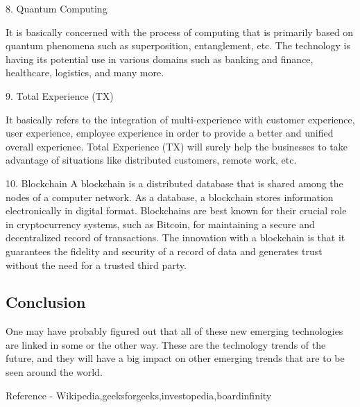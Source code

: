 \documentclass[11pt]{article}
\begin{document}
8. Quantum Computing

It is basically concerned with the process of computing that is primarily based on quantum phenomena such as superposition, entanglement, etc. The technology is having its potential use in various domains such as banking and finance, healthcare, logistics, and many more.

9. Total Experience (TX)

It basically refers to the integration of multi-experience with customer experience, user experience, employee experience in order to provide a better and unified overall experience. Total Experience (TX) will surely help the businesses to take advantage of situations like distributed customers, remote work, etc. 

10. Blockchain
A blockchain is a distributed database that is shared among the nodes of a computer network. As a database, a blockchain stores information electronically in digital format. Blockchains are best known for their crucial role in cryptocurrency systems, such as Bitcoin, for maintaining a secure and decentralized record of transactions. The innovation with a blockchain is that it guarantees the fidelity and security of a record of data and generates trust without the need for a trusted third party.
\subsection{Conclusion}

One may have probably figured out that all of these new emerging technologies are linked in some or the other way. These are the technology trends of the future, and they will have a big impact on other emerging trends that are to be seen around the world.

\large Reference -
Wikipedia,geeksforgeeks,investopedia,boardinfinity
\end{document}
